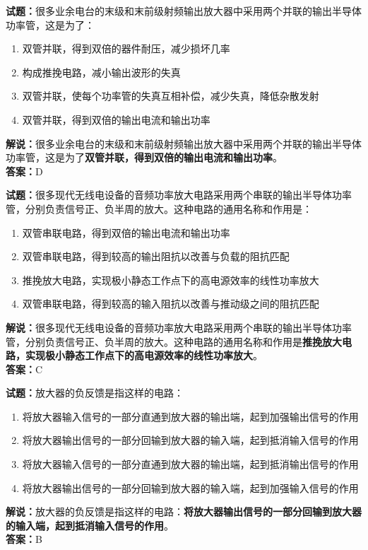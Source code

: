 \documentclass{ctexbook}
\begin{document}
\bigskip


\noindent\textbf{试题：}很多业余电台的末级和末前级射频输出放大器中采用两个并联的输出半导体功率管，这是为了：
\begin{enumerate}[leftmargin=3em]
\item 双管并联，得到双倍的器件耐压，减少损坏几率
\item 构成推挽电路，减小输出波形的失真
\item 双管并联，使每个功率管的失真互相补偿，减少失真，降低杂散发射
\item 双管并联，得到双倍的输出电流和输出功率
\end{enumerate}
\noindent\textbf{解说：}很多业余电台的末级和末前级射频输出放大器中采用两个并联的输出半导体功率管，这是为了\textbf{双管并联，得到双倍的输出电流和输出功率}。\\\noindent\textbf{答案：}D





\bigskip


\noindent\textbf{试题：}很多现代无线电设备的音频功率放大电路采用两个串联的输出半导体功率管，分别负责信号正、负半周的放大。这种电路的通用名称和作用是：
\begin{enumerate}[leftmargin=3em]
\item 双管串联电路，得到双倍的输出电流和输出功率
\item 双管串联电路，得到较高的输出阻抗以改善与负载的阻抗匹配
\item 推挽放大电路，实现极小静态工作点下的高电源效率的线性功率放大
\item 双管串联电路，得到较高的输入阻抗以改善与推动级之间的阻抗匹配
\end{enumerate}
\noindent\textbf{解说：}很多现代无线电设备的音频功率放大电路采用两个串联的输出半导体功率管，分别负责信号正、负半周的放大。这种电路的通用名称和作用是\textbf{推挽放大电路，实现极小静态工作点下的高电源效率的线性功率放大}。\\\noindent\textbf{答案：}C






\bigskip


\noindent\textbf{试题：}放大器的负反馈是指这样的电路：
\begin{enumerate}[leftmargin=3em]
\item 将放大器输入信号的一部分直通到放大器的输出端，起到加强输出信号的作用
\item 将放大器输出信号的一部分回输到放大器的输入端，起到抵消输入信号的作用
\item 将放大器输入信号的一部分直通到放大器的输出端，起到抵消输出信号的作用
\item 将放大器输出信号的一部分回输到放大器的输入端，起到加强输入信号的作用

\end{enumerate}
\noindent\textbf{解说：}放大器的负反馈是指这样的电路：\textbf{将放大器输出信号的一部分回输到放大器的输入端，起到抵消输入信号的作用}。\\\noindent\textbf{答案：}B
\end{document}
